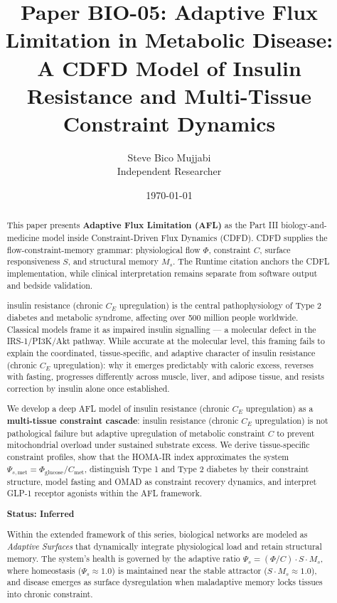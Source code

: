 \documentclass[11pt]{article}
\title{\textbf{Paper BIO-05: Adaptive Flux Limitation in Metabolic Disease:\\ A CDFD Model of Insulin Resistance and Multi-Tissue Constraint Dynamics}}
\author{Steve Bico Mujjabi\\ \small Independent Researcher}
\date{\today}
\begin{document}
\maketitle

\begin{abstract}

This paper presents \textbf{Adaptive Flux Limitation (AFL)} as the Part III biology-and-medicine model inside Constraint-Driven Flux Dynamics (CDFD). CDFD supplies the flow-constraint-memory grammar: physiological flow $\Phi$, constraint $C$, surface responsiveness $S$, and structural memory $M_s$. The Runtime citation anchors the CDFL implementation, while clinical interpretation remains separate from software output and bedside validation.

insulin resistance (chronic $C_E$ upregulation) is the central pathophysiology of Type 2 diabetes and metabolic syndrome, affecting over 500 million people worldwide. Classical models frame it as impaired insulin signalling --- a molecular defect in the IRS-1/PI3K/Akt pathway. While accurate at the molecular level, this framing fails to explain the coordinated, tissue-specific, and adaptive character of insulin resistance (chronic $C_E$ upregulation): why it emerges predictably with caloric excess, reverses with fasting, progresses differently across muscle, liver, and adipose tissue, and resists correction by insulin alone once established.

We develop a deep AFL model of insulin resistance (chronic $C_E$ upregulation) as a \textbf{multi-tissue constraint cascade}: insulin resistance (chronic $C_E$ upregulation) is not pathological failure but adaptive upregulation of metabolic constraint $C$ to prevent mitochondrial overload under sustained substrate excess. We derive tissue-specific constraint profiles, show that the HOMA-IR index approximates the system $\Psi_{s,\mathrm{met}} = \Phi_{\mathrm{glucose}}/C_{\mathrm{met}}$, distinguish Type 1 and Type 2 diabetes by their constraint structure, model fasting and OMAD as constraint recovery dynamics, and interpret GLP-1 receptor agonists within the AFL framework.

\textbf{Status: Inferred}

\medskip
\noindent Within the extended framework of this series, biological networks are modeled as \emph{Adaptive Surfaces} that dynamically integrate physiological load and retain structural memory. The system's health is governed by the adaptive ratio $\Psi_s = (\Phi/C) \cdot S \cdot M_s$, where homeostasis ($\Psi_s \approx 1.0$) is maintained near the stable attractor ($S \cdot M_s \approx 1.0$), and disease emerges as surface dysregulation when maladaptive memory locks tissues into chronic constraint.

\end{abstract}
\end{document}
